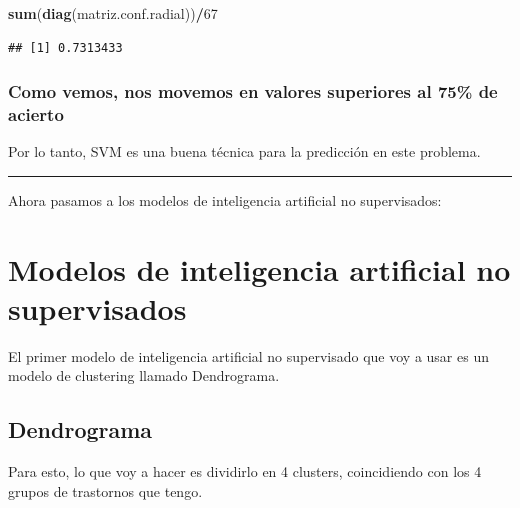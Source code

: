 \documentclass[]{article}
\newenvironment{Shaded}{\begin{snugshade}}{\end{snugshade}}
\newcommand{\KeywordTok}[1]{\textcolor[rgb]{0.13,0.29,0.53}{\textbf{#1}}}
\newcommand{\DecValTok}[1]{\textcolor[rgb]{0.00,0.00,0.81}{#1}}
\newcommand{\OperatorTok}[1]{\textcolor[rgb]{0.81,0.36,0.00}{\textbf{#1}}}
\newcommand{\NormalTok}[1]{#1}
\begin{document}
\begin{Shaded}
\begin{Highlighting}[]
\KeywordTok{sum}\NormalTok{(}\KeywordTok{diag}\NormalTok{(matriz.conf.radial))}\OperatorTok{/}\DecValTok{67}
\end{Highlighting}
\end{Shaded}

\begin{verbatim}
## [1] 0.7313433
\end{verbatim}

\subsubsection{Como vemos, nos movemos en valores superiores al 75\% de
acierto}\label{como-vemos-nos-movemos-en-valores-superiores-al-75-de-acierto}

Por lo tanto, SVM es una buena técnica para la predicción en este
problema.

\begin{center}\rule{0.5\linewidth}{\linethickness}\end{center}

Ahora pasamos a los modelos de inteligencia artificial no supervisados:

\section{Modelos de inteligencia artificial no
supervisados}\label{modelos-de-inteligencia-artificial-no-supervisados}

El primer modelo de inteligencia artificial no supervisado que voy a
usar es un modelo de clustering llamado Dendrograma.

\subsection{Dendrograma}\label{dendrograma}

Para esto, lo que voy a hacer es dividirlo en 4 clusters, coincidiendo
con los 4 grupos de trastornos que tengo.
\end{document}
